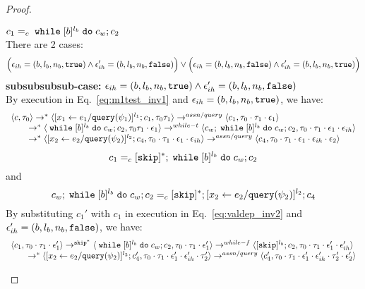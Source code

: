 \begin{proof}
\begin{case}[$\trace_2 = \trace_{ih} \cdot \event_{ih}$]
\begin{subcase}
\begin{subsubcase}
%
\begin{subproof} $c_1 =_c \;\mathtt{while}\; [b]^{l_b} \;\mathtt{do}\; c_w;{c}_2$ 
%
\\
There are 2 cases:
$$
\Big(\mathtt{\epsilon}_{ih} = (b, l_b, n_b, \mathtt{true}) \land \mathtt{\epsilon}_{ih}' = (b, l_b, n_b, \mathtt{false}) \Big)
\lor 
\Big(\mathtt{\epsilon}_{ih} = (b, l_b, n_b, \mathtt{false}) \land \mathtt{\epsilon}_{ih}' = (b, l_b, n_b, \mathtt{true}) \Big)
$$
%
\textbf{subsubsubsub-case:} $\mathtt{\epsilon}_{ih} = (b, l_b, n_b, \mathtt{true}) \land \mathtt{\epsilon}_{ih}' = (b, l_b, n_b, \mathtt{false})$
\\
By execution in Eq.~\ref{eq:m1test_inv1} and $\mathtt{\epsilon}_{ih} = (b, l_b, n_b, \mathtt{true})$, we have:
\[
  \begin{array}{l}   
  \langle {c}, \mathtt{\tau}_0 \rangle \rightarrow^{*} 
  \langle [\mathrel{ {x}_1 \leftarrow e_1 / {\tt query}(\psi_1) }]^{l_1} ; {c}_1, \mathtt{\tau}_0 \mathtt{\tau}_1 \rangle  
  \rightarrow^{assn/query}
  \langle c_1, \mathtt{\tau}_0 \cdot \mathtt{\tau}_1 \cdot \mathtt{\epsilon}_1 \rangle 
  \\
  \qquad \rightarrow^{*} 
  \langle \;\mathtt{while}\; [b]^{l_b} \;\mathtt{do}\; c_w;{c}_2, 
  \mathtt{\tau}_0 \mathtt{\tau}_1 \cdot \mathtt{\epsilon}_1 \rangle 
  \rightarrow^{while-t} 
  \langle c_w;\;\mathtt{while}\; [b]^{l_b} \;\mathtt{do}\; c_w; c_2, \mathtt{\tau}_0 \cdot \mathtt{\tau}_1 \cdot \mathtt{\epsilon}_1 \cdot \mathtt{\epsilon}_{ih} \rangle 
  \\
  \qquad \rightarrow^{*} 
  \langle [\mathrel{ {x}_2 \leftarrow e_2 / {\tt query}(\psi_2) }]^{l_2};{c}_4, 
  \mathtt{\tau}_0 \cdot \mathtt{\tau}_1 \cdot \mathtt{\epsilon}_1 \cdot \mathtt{\epsilon}_{ih} \rangle 
  \rightarrow^{assn/query} 
  \langle {c}_4,  \mathtt{\tau}_0 \cdot \mathtt{\tau}_1 \cdot \mathtt{\epsilon}_1 \cdot \mathtt{\epsilon}_{ih} \cdot \mathtt{\epsilon}_2 \rangle 
  \end{array}
\]
% 
\[
  c_1 =_c [\mathtt{skip}]{}^*; \;\mathtt{while}\; [b]^{l_b} \;\mathtt{do}\; c_w;{c}_2
\]
and
\[
  c_w;\;\mathtt{while}\; [b]^{l_b} \;\mathtt{do}\; c_w; c_2 =_c [\mathtt{skip}]{}^*;[\mathrel{ {x}_2 \leftarrow e_2 / {\tt query}(\psi_2) }]^{l_2};{c}_4
\]
%
By substituting $c_1'$ with $c_1$ in execution in Eq.~\ref{eq:valdep_inv2} and $\mathtt{\epsilon}_{ih}' = (b, l_b, n_b, \mathtt{false})$, we have:
  \[
  \begin{array}{l}   
  \langle c_1, \mathtt{\tau}_0 \cdot \mathtt{\tau}_1 \cdot \mathtt{\epsilon}_1' \rangle 
  \rightarrow^{\mathtt{skip}^*} 
  \langle \;\mathtt{while}\; [b]^{l_b} \;\mathtt{do}\; c_w;{c}_2, \mathtt{\tau}_0 \cdot \mathtt{\tau}_1 \cdot \mathtt{\epsilon}_1' \rangle 
  \rightarrow^{while-f} 
  \langle [\mathtt{skip}]^{l_b};c_2, \mathtt{\tau}_0 \cdot \mathtt{\tau}_1 \cdot \mathtt{\epsilon}_1' \cdot \mathtt{\epsilon}_{ih}' \rangle 
  \\
  \qquad \rightarrow^{*} 
  \langle [\mathrel{ {x}_2 \leftarrow e_2 / {\tt query}(\psi_2) }]^{l_2};{c}_4', 
  \mathtt{\tau}_0 \cdot \mathtt{\tau}_1 \cdot \mathtt{\epsilon}_1' \cdot \mathtt{\epsilon}_{ih}' \cdot \mathtt{\tau}_2' \rangle
  \rightarrow^{assn/query} 
  \langle {c}_4',  \mathtt{\tau}_0 \cdot \mathtt{\tau}_1 \cdot \mathtt{\epsilon}_1' \cdot \mathtt{\epsilon}_{ih}' \cdot \mathtt{\tau}_2' \cdot \mathtt{\epsilon}_2' \rangle 

\end{array}\]
\end{subproof}
\end{subsubcase}
\end{subcase}
\end{case}
\end{proof}
